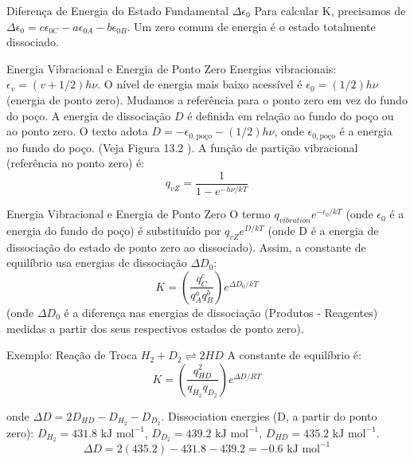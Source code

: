 \documentclass{beamer}
\begin{document}
\begin{frame}{Diferença de Energia do Estado Fundamental $\Delta\epsilon_0$}
        Para calcular K, precisamos de $\Delta\epsilon_0 = c\epsilon_{0C} - a\epsilon_{0A} - b\epsilon_{0B}$.
        Um zero comum de energia é o estado totalmente dissociado. 
\end{frame}

\begin{frame}{Energia Vibracional e Energia de Ponto Zero}
        Energias vibracionais: $\epsilon_v = (v + 1/2)h\nu$. O nível de energia mais baixo acessível é $\epsilon_0 = (1/2)h\nu$ (energia de ponto zero). 
        Mudamos a referência para o ponto zero em vez do fundo do poço.
        A energia de dissociação $D$ é definida em relação ao fundo do poço ou ao ponto zero. O texto adota $D = -\epsilon_{0,\text{poço}} - (1/2)h\nu$, onde $\epsilon_{0,\text{poço}}$ é a energia no fundo do poço. (Veja Figura 13.2 ).
        A função de partição vibracional (referência no ponto zero) é:
        $$ q_{vZ} = \frac{1}{1 - e^{-h\nu/kT}} $$
         
\end{frame}

\begin{frame}{Energia Vibracional e Energia de Ponto Zero}
        O termo $q_{vibration} e^{-\epsilon_0/kT}$ (onde $\epsilon_0$ é a energia do fundo do poço) é substituído por $q_{vZ} e^{D/kT}$ (onde D é a energia de dissociação do estado de ponto zero ao dissociado).
        Assim, a constante de equilíbrio usa energias de dissociação $\Delta D_0$:
        $$ K = \left(\frac{q_C^c}{q_A^a q_B^b}\right) e^{\Delta D_0/kT} $$
        (onde $\Delta D_0$ é a diferença nas energias de dissociação (Produtos - Reagentes) medidas a partir dos seus respectivos estados de ponto zero).
\end{frame}

\begin{frame}{Exemplo: Reação de Troca $H_2 + D_2 \rightleftharpoons 2HD$}
    A constante de equilíbrio é:
    $$ K = \left(\frac{q_{HD}^2}{q_{H_2}q_{D_2}}\right) e^{\Delta D/RT} $$
    
    onde $\Delta D = 2D_{HD} - D_{H_2} - D_{D_2}$. 
    Dissociation energies (D, a partir do ponto zero): $D_{H_2} = 431.8 \text{ kJ mol}^{-1}$, $D_{D_2} = 439.2 \text{ kJ mol}^{-1}$, $D_{HD} = 435.2 \text{ kJ mol}^{-1}$.
    $$ \Delta D = 2(435.2) - 431.8 - 439.2 = -0.6 \text{ kJ mol}^{-1} $$
    
\end{frame}
\end{document}
